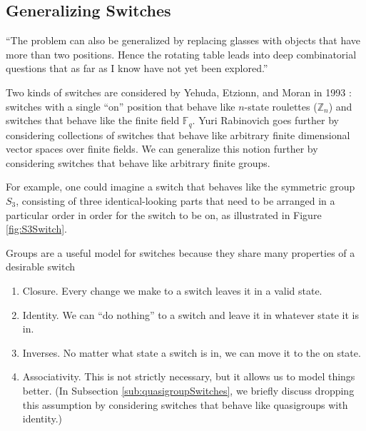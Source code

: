 \subsection{Generalizing Switches}
``The problem can also be generalized by replacing glasses with objects that
have more than two positions. Hence the rotating table leads into deep
combinatorial questions that as far as I know have not yet been explored.''
\cite{Gardner1979Solution}

Two kinds of switches are considered by Yehuda, Etzionn, and Moran in 1993
\cite{Yehuda1993}: switches with a single ``on'' position that behave like
$n$-state roulettes ($\mathbb Z_n$) and switches that behave like
the finite field $\mathbb F_q$.
Yuri Rabinovich \cite{Rabinovich2022} goes further by considering collections
of switches that behave like arbitrary finite dimensional vector spaces over
finite fields.
We can generalize this notion further by considering
switches that behave like arbitrary finite groups.

For example, one could imagine a switch that behaves like the symmetric
group $S_3$, consisting of three identical-looking parts that need to be
arranged in a particular order in order for the switch to be on,
as illustrated in Figure \ref{fig:S3Switch}.

Groups are a useful model for switches because they share many properties of a
desirable switch \begin{enumerate}
  \item Closure. Every change we make to a switch leaves it in a valid state.
  \item Identity. We can ``do nothing'' to a switch and leave it in whatever
    state it is in.
  \item Inverses. No matter what state a switch is in, we can move it to the
    on state.
  \item Associativity. This is not strictly necessary, but it allows us to
    model things better.
    (In Subsection \ref{sub:quasigroupSwitches}, we briefly discuss dropping
    this assumption by considering switches that behave like quasigroups with
    identity.)
\end{enumerate}


